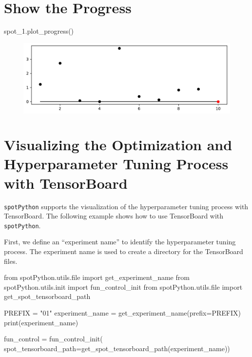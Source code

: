 \documentclass[
  letterpaper,
  DIV=11,
  numbers=noendperiod]{scrreprt}
\newenvironment{Shaded}{\begin{snugshade}}{\end{snugshade}}
\newcommand{\BuiltInTok}[1]{\textcolor[rgb]{0.00,0.23,0.31}{#1}}
\newcommand{\ImportTok}[1]{\textcolor[rgb]{0.00,0.46,0.62}{#1}}
\newcommand{\NormalTok}[1]{\textcolor[rgb]{0.00,0.23,0.31}{#1}}
\newcommand{\OperatorTok}[1]{\textcolor[rgb]{0.37,0.37,0.37}{#1}}
\newcommand{\StringTok}[1]{\textcolor[rgb]{0.13,0.47,0.30}{#1}}
\begin{document}
\hypertarget{show-the-progress-1}{%
\section{Show the Progress}\label{show-the-progress-1}}

\begin{Shaded}
\begin{Highlighting}[]
\NormalTok{spot\_1.plot\_progress()}
\end{Highlighting}
\end{Shaded}

\begin{figure}[H]

{\centering \includegraphics{007_num_spot_intro_files/figure-pdf/cell-12-output-1.pdf}

}

\end{figure}

\hypertarget{sec-visualizing-tensorboard-01}{%
\section{Visualizing the Optimization and Hyperparameter Tuning Process
with TensorBoard}\label{sec-visualizing-tensorboard-01}}

\texttt{spotPython} supports the visualization of the hyperparameter
tuning process with TensorBoard. The following example shows how to use
TensorBoard with \texttt{spotPython}.

First, we define an ``experiment name'' to identify the hyperparameter
tuning process. The experiment name is used to create a directory for
the TensorBoard files.

\begin{Shaded}
\begin{Highlighting}[]
\ImportTok{from}\NormalTok{ spotPython.utils.}\BuiltInTok{file} \ImportTok{import}\NormalTok{ get\_experiment\_name}
\ImportTok{from}\NormalTok{ spotPython.utils.init }\ImportTok{import}\NormalTok{ fun\_control\_init}
\ImportTok{from}\NormalTok{ spotPython.utils.}\BuiltInTok{file} \ImportTok{import}\NormalTok{ get\_spot\_tensorboard\_path}

\NormalTok{PREFIX }\OperatorTok{=} \StringTok{"01"}
\NormalTok{experiment\_name }\OperatorTok{=}\NormalTok{ get\_experiment\_name(prefix}\OperatorTok{=}\NormalTok{PREFIX)}
\BuiltInTok{print}\NormalTok{(experiment\_name)}

\NormalTok{fun\_control }\OperatorTok{=}\NormalTok{ fun\_control\_init(}
\NormalTok{    spot\_tensorboard\_path}\OperatorTok{=}\NormalTok{get\_spot\_tensorboard\_path(experiment\_name))}
\end{Highlighting}
\end{Shaded}
\end{document}
